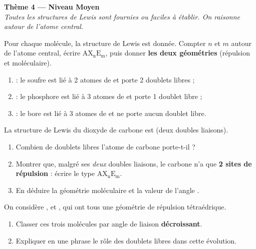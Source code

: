\documentclass[11pt,a4paper]{article}
\newcommand{\AX}[2]{\ensuremath{\mathrm{AX_{#1}E_{#2}}}}
\begin{document}
\begin{center}
{\Large\bfseries\color{primarydark}Thème 4 — Niveau Moyen}\\[2pt]
{\small\itshape Toutes les structures de Lewis sont fournies ou faciles à établir. On raisonne autour de l'atome central.}
\end{center}
\medskip

\begin{exo}
Pour chaque molécule, la structure de Lewis est donnée. Compter $n$ et $m$ autour de l'atome
central, écrire \AX{n}{m}, puis donner \textbf{les deux géométries} (répulsion et moléculaire).
\begin{enumerate}[label=\alph*),leftmargin=2em,itemsep=3pt]
  \item {} : le soufre est lié à 2 atomes de  et porte 2 doublets libres ;
  \item {} : le phosphore est lié à 3 atomes de  et porte 1 doublet libre ;
  \item {} : le bore est lié à 3 atomes de  et ne porte aucun doublet libre.
\end{enumerate}
\end{exo}

\begin{exo}
La structure de Lewis du dioxyde de carbone est  (deux doubles liaisons).
\begin{enumerate}[label=\alph*),leftmargin=2em,itemsep=1pt]
  \item Combien de doublets libres l'atome de carbone porte-t-il ?
  \item Montrer que, malgré ses \emph{deux} doubles liaisons, le carbone n'a que \textbf{2 sites de
        répulsion} : écrire le type \AX{n}{m}.
  \item En déduire la géométrie moléculaire et la valeur de l'angle .
\end{enumerate}
\end{exo}

\begin{exo}
On considère ,  et , qui ont tous une géométrie de répulsion tétraédrique.
\begin{enumerate}[label=\alph*),leftmargin=2em,itemsep=1pt]
  \item Classer ces trois molécules par angle de liaison \textbf{décroissant}.
  \item Expliquer en une phrase le rôle des doublets libres dans cette évolution.
\end{enumerate}
\end{exo}
\end{document}
